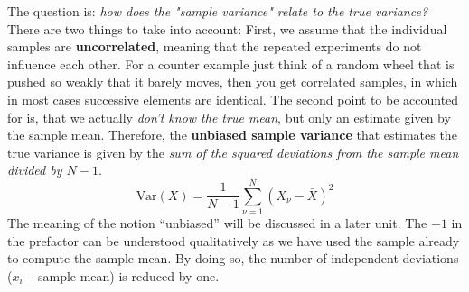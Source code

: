 \documentclass[12pt, a4paper]{scrartcl}
\begin{document}
The question is: \textit{how does the "sample variance" relate to the true variance?}
There are two things to take into account: 
First, we assume that the individual samples are \textbf{uncorrelated}, meaning that the repeated experiments do not influence each other. For a counter example just think of a random wheel that is pushed so weakly that it barely moves, then you get correlated samples, in which in most cases successive elements are identical.
The second point to be accounted for is, that we actually \textit{don't know the true mean}, but only an estimate given by the sample mean.
Therefore, the \textbf{unbiased sample variance} that estimates the true variance is given by the \textit{sum of the squared deviations from the sample mean divided by $N - 1$}.\\
\begin{equation*}\boxed{\text{Var}(X)=\frac{1}{N-1}\sum_{\nu = 1}^N(X_\nu-\bar{X})^2}\end{equation*}
The meaning of the notion ``unbiased'' will be discussed in a later unit.
The $-1$ in the prefactor can be understood qualitatively as we have used the sample already to compute the sample mean. By doing so, the number of independent deviations ($x_i$ – sample mean) is reduced by one.\\

\\
\end{document}

